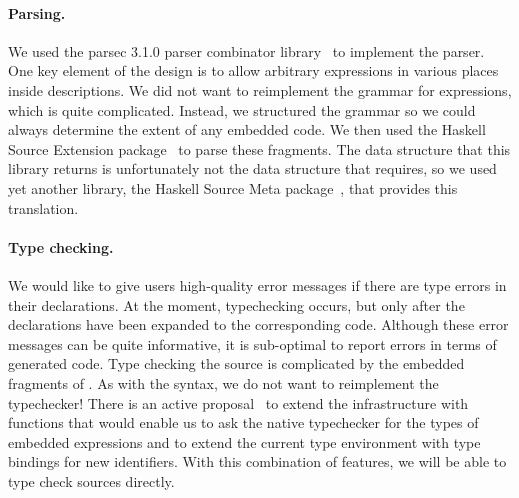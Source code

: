 \paragraph{Parsing.}  
We used the parsec 3.1.0 parser
combinator library~\cite{LeijenMeijer:parsec} to implement the \forest{} parser.  One key element
of the \forest{} design is to allow arbitrary \haskell{} expressions
in various places inside \forest{} descriptions.  We did not want to
reimplement the grammar for \haskell{} expressions, which is quite
complicated.  Instead, we structured the \forest{} grammar so we could
always determine the extent of any embedded \haskell{} code.  We then
used the Haskell Source Extension package~\cite{haskell-src-exts} to parse
these fragments.  The data structure that this library returns is
unfortunately not the data structure that \template{} requires, so we
used yet another library, the Haskell Source Meta
package~\cite{haskell-src-meta}, that provides this translation. 


\paragraph{Type checking.}
We would like to give users high-quality error messages if there
are type errors in their \forest{} declarations.  At the moment, 
typechecking occurs, but only after the \forest{} declarations have
been expanded to the corresponding \haskell{} code.  Although these
error messages can be quite informative, it is sub-optimal to report
errors in terms of generated code.  Type checking the \forest{} source
is complicated by the embedded fragments of \haskell{}.  As with the
syntax, we do not want to reimplement the \haskell{} typechecker!  
There is an active proposal~\cite{extend-templates} to extend the \template{} infrastructure
with functions that would enable us to ask the native \haskell{}
typechecker for the types of embedded expressions and to extend the
current type environment with type bindings for new identifiers.  With
this combination of features, we will be able to type check \forest{}
sources directly.

